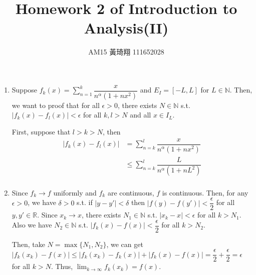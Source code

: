 \documentclass[12pt]{article}
\title{Homework 2 of Introduction to Analysis(II)}
\author{AM15 黃琦翔 111652028}
\begin{document}
\maketitle
\begin{enumerate}
    \item Suppose $f_k(x) = \displaystyle\sum_{n=1}^{k} \dfrac{x}{n^\alpha (1+nx^2)}$ and $E_I = [-L, L]$ for $L \in \mathbb{N}$.
    Then, we want to proof that 
    for all $\epsilon > 0$, there exists $N \in \mathbb{N}$ s.t. 
    $|f_k(x) - f_l(x)| < \epsilon$ for all $k, l > N$ and all $x \in I_L$.

    First, suppose that $l > k > N$, then \begin{align*}
        |f_k(x) - f_l(x)| &= \sum_{n=k}^l \dfrac{x}{n^\alpha (1+nx^2)}\\
        &\leq \sum_{n=k}^{l} \dfrac{L}{n^\alpha(1+nL^2)}\\
    \end{align*}


    \item Since $f_k \to f$ uniformly and $f_k$ are continuous, $f$ is continuous.
    Then, for any $\epsilon > 0$, we have $\delta > 0 $ s.t. if $|y - y'| < \delta$ then $|f(y) - f(y')| < \dfrac{\epsilon}{2}$ for all $y, y' \in \mathbb{R}$.
    Since $x_k \to x$, there exists $N_1 \in \mathbb{N}$ s.t. $|x_k - x| < \epsilon$ for all $k > N_1$.
    Also we have $N_2 \in \mathbb{N}$ s.t. $|f_k(x) - f(x)| < \dfrac{\epsilon}{2}$ for all $k > N_2$.

    Then, take $N  = \max\{ N_1, N_2\}$, we can get $|f_k(x_k) - f(x)| \leq |f_k(x_k) - f_k(x)| + |f_k(x) - f(x)| = \dfrac{\epsilon}{2} + \dfrac{\epsilon}{2} = \epsilon$ for all $k > N$.
    Thus, $\displaystyle\lim_{k\to\infty} f_k(x_k) = f(x)$.


\end{enumerate}
\end{document}
